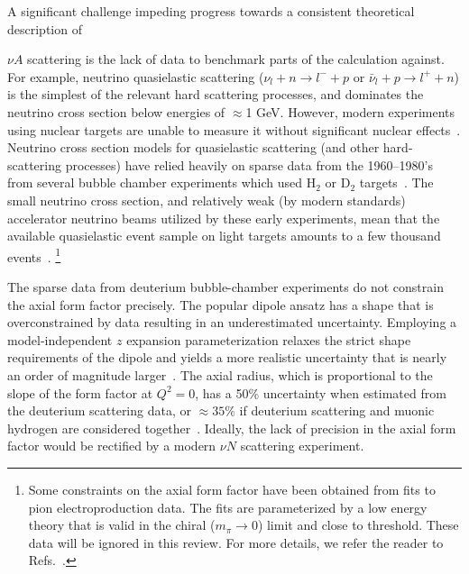 \documentclass{ar-1col}
\begin{document}
A significant challenge impeding progress towards a consistent theoretical description of%
\begin{marginnote}
\end{marginnote}%
$\nu A$ scattering is the lack of data to benchmark parts of the calculation against. For example, neutrino quasielastic scattering ($\nu_{l} + n \rightarrow l^{-} + p$ or $\bar{\nu}_{l} + p \rightarrow l^{+} + n$) is the simplest of the relevant hard scattering processes, and dominates the neutrino cross section below energies of $\approx$1 GeV. However, modern experiments using nuclear targets are unable to measure it without significant nuclear effects~\cite{garvey_review_2014, NuSTEC:2017hzk}.
Neutrino cross section models for quasielastic scattering (and other hard-scattering processes) have relied heavily on sparse data from the 1960--1980's from several bubble chamber experiments which used H$_{2}$ or D$_2$ targets~\cite{zeller12, ParticleDataGroup:2020ssz}.
The small neutrino cross section, and relatively weak (by modern standards) accelerator neutrino beams utilized by these early experiments, mean that the available quasielastic event sample on light targets amounts to a few thousand events~\cite{ANL_Barish_1977, BNL_Fanourakis_1980, BNL_Baker_1981, Kitagaki:1983px, Allasia:1990uy}.%
\footnote{Some constraints on the axial form factor have been obtained from fits
 to pion electroproduction data.
The fits are parameterized by a low energy theory that is valid in the chiral
 ($m_\pi\to0$) limit and close to threshold.
These data will be ignored in this review.
For more details, we refer the reader to Refs.~\cite{Bernard:1993bq,Bernard:2001rs}.
}

The sparse data from deuterium bubble-chamber experiments do not constrain
the axial form factor precisely.
The popular dipole ansatz has a shape that
is overconstrained by data resulting in an underestimated uncertainty.
Employing a model-independent $z$ expansion parameterization
relaxes the strict shape requirements of the dipole and yields
a more realistic uncertainty that is nearly an order of magnitude larger~\cite{Meyer:2016oeg}.
The axial radius, which is proportional to the slope of the form factor at $Q^2=0$,
has a 50\% uncertainty when estimated from the deuterium scattering data,
or $\approx35\%$ if deuterium scattering and muonic hydrogen are considered
together~\cite{Hill:2017wgb}.
Ideally, the lack of precision in the axial form factor would
be rectified by a modern $\nu N$ scattering experiment.
\end{document}
